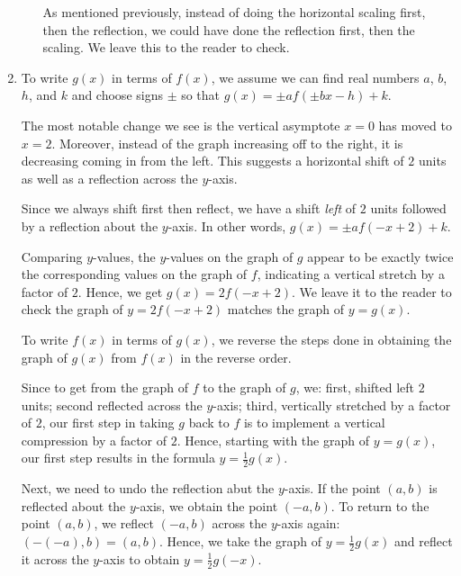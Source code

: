 \documentclass{ximera}
\begin{document}
\begin{example}
\begin{enumerate}
\begin{enumerate}
As mentioned previously, instead of doing the horizontal scaling first, then the reflection, we could have done the reflection first, then the scaling.  We leave this to the reader to check.

 \end{enumerate}

 
 \item To write $g(x)$ in terms of $f(x)$, we assume we can find real numbers $a$, $b$, $h$, and $k$ and choose signs $\pm$ so that $g(x) = \pm a f(\pm b x - h)+k$.   
 
 \smallskip
 
 The most notable change we see is the vertical asymptote $x=0$ has moved to $x=2$.  Moreover, instead of the graph increasing off to the right, it is decreasing coming in from the left.  This suggests a horizontal shift of $2$ units as well as a reflection across the $y$-axis.  
 
 \smallskip
 
 Since we always shift first then reflect, we have a shift \textit{left} of $2$ units followed by a reflection about the $y$-axis.  In other words, $g(x) = \pm a f(-x+2) + k$.  
 
 \smallskip
 
 Comparing $y$-values, the $y$-values on the graph of $g$ appear to be exactly twice the corresponding values on the graph of $f$, indicating a vertical stretch by a factor of $2$.  Hence, we get $g(x) = 2 f(-x+2)$.  We leave it to the reader to check the graph of $y=2f(-x+2)$ matches the graph of $y=g(x)$.  
 
 \smallskip
 
To write $f(x)$ in terms of $g(x)$, we reverse the steps done in obtaining the graph of $g(x)$ from $f(x)$ in the reverse order.  

\smallskip

Since to get from the graph of $f$ to the graph of $g$, we: first, shifted left $2$ units; second reflected across the $y$-axis; third, vertically stretched by a factor of $2$, our first step in taking $g$ back to $f$ is to implement a vertical compression by a factor of $2$.  Hence, starting with the graph of $y=g(x)$, our first step results in the formula $y = \frac{1}{2} g(x)$. 

\smallskip

 Next, we need to undo the reflection abut the $y$-axis.  If the point $(a,b)$ is reflected about the $y$-axis, we obtain the point $(-a,b)$.  To return to the point $(a,b)$, we reflect $(-a,b)$ across the $y$-axis again: $(-(-a),b) = (a,b)$.  Hence, we take the graph of $y = \frac{1}{2} g(x)$ and reflect it across the $y$-axis to obtain $y = \frac{1}{2} g(-x)$.  
 

\end{enumerate}
\end{example}
\end{document}
